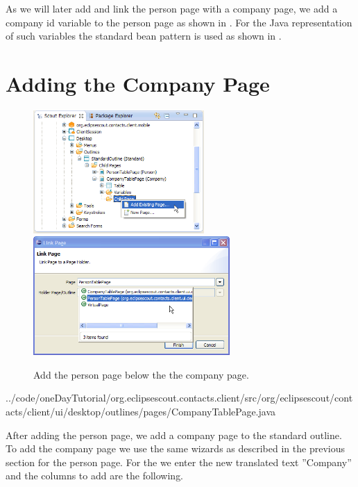 \documentclass[a4paper,10pt,twoside]{book}
\begin{document}
As we will later add and link the person page with a company page, we add a company id variable to the person page as shown in . 
For the Java representation of such variables the standard bean pattern is used as shown in .

\section{Adding the Company Page}

\begin{figure}
\includegraphics[width=6.5cm]{add_existing_page_contextmenu.png} \hspace{5mm}
\includegraphics[width=7.5cm]{add_existing_page.png}
\caption{Add the person page below the the company page.}
\end{figure}


{../code/oneDayTutorial/org.eclipsescout.contacts.client/src/org/eclipsescout/contacts/client/ui/desktop/outlines/pages/CompanyTablePage.java}

After adding the person page, we add a company page to the standard outline. 
To add the company page we use the same wizards as described in the previous section for the person page. 
For the  we enter the new translated text ''Company'' and the columns to add are the following.
\end{document}
